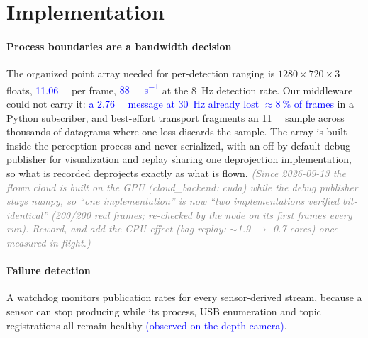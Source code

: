 \documentclass[conference]{IEEEtran}
\newcommand{\bench}[1]{\textcolor{blue}{#1}}
\newcommand{\note}[1]{\textcolor{gray}{\textit{(#1)}}}
\begin{document}
\section{Implementation}
\label{sec:impl}

\paragraph{Process boundaries are a bandwidth decision} The organized point array
needed for per-detection ranging is $1280\times720\times3$ floats,
\bench{\SI{11.06}{\mega\byte}} per frame, \bench{\SI{88}{\mega\byte\per\second}}
at the \SI{8}{\hertz} detection rate. Our middleware could not carry it: \bench{a
\SI{2.76}{\mega\byte} message at \SI{30}{\hertz} already lost
${\approx}\SI{8}{\percent}$ of frames} in a Python subscriber, and best-effort
transport fragments an \SI{11}{\mega\byte} sample across thousands of datagrams
where one loss discards the sample. The array is built inside the perception
process and never serialized, with an off-by-default debug publisher for
visualization and replay sharing one deprojection implementation, so what is
recorded deprojects exactly as what is flown.
\note{Since 2026-09-13 the flown cloud is built on the GPU (cloud\_backend:
cuda) while the debug publisher stays numpy, so ``one implementation'' is now
``two implementations verified bit-identical'' (200/200 real frames; re-checked
by the node on its first frames every run). Reword, and add the CPU effect
(bag replay: $\sim$1.9 $\to$ 0.7 cores) once measured in flight.}

\paragraph{Failure detection} A watchdog monitors publication rates for every
sensor-derived stream, because a sensor can stop producing while its process, USB
enumeration and topic registrations all remain healthy \bench{(observed on the
depth camera)}.
\end{document}
